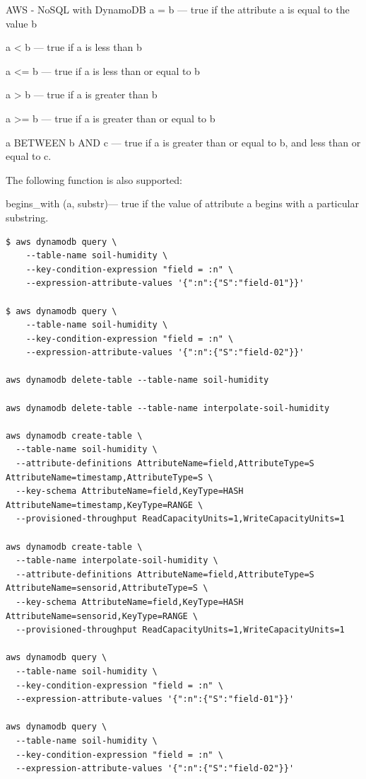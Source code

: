 \begin{frame}{AWS - NoSQL with DynamoDB}
    a = b — true if the attribute a is equal to the value b

    a < b — true if a is less than b

    a <= b — true if a is less than or equal to b

    a > b — true if a is greater than b

    a >= b — true if a is greater than or equal to b

    a BETWEEN b AND c — true if a is greater than or equal to b, and less than or equal to c.

The following function is also supported:

    begins_with (a, substr)— true if the value of attribute a begins with a particular substring.



\begin{lstlisting}
$ aws dynamodb query \
    --table-name soil-humidity \
    --key-condition-expression "field = :n" \
    --expression-attribute-values '{":n":{"S":"field-01"}}'

$ aws dynamodb query \
    --table-name soil-humidity \
    --key-condition-expression "field = :n" \
    --expression-attribute-values '{":n":{"S":"field-02"}}'
    
aws dynamodb delete-table --table-name soil-humidity

aws dynamodb delete-table --table-name interpolate-soil-humidity

aws dynamodb create-table \
  --table-name soil-humidity \
  --attribute-definitions AttributeName=field,AttributeType=S AttributeName=timestamp,AttributeType=S \
  --key-schema AttributeName=field,KeyType=HASH AttributeName=timestamp,KeyType=RANGE \
  --provisioned-throughput ReadCapacityUnits=1,WriteCapacityUnits=1

aws dynamodb create-table \
  --table-name interpolate-soil-humidity \
  --attribute-definitions AttributeName=field,AttributeType=S AttributeName=sensorid,AttributeType=S \
  --key-schema AttributeName=field,KeyType=HASH AttributeName=sensorid,KeyType=RANGE \
  --provisioned-throughput ReadCapacityUnits=1,WriteCapacityUnits=1

aws dynamodb query \
  --table-name soil-humidity \
  --key-condition-expression "field = :n" \
  --expression-attribute-values '{":n":{"S":"field-01"}}'

aws dynamodb query \
  --table-name soil-humidity \
  --key-condition-expression "field = :n" \
  --expression-attribute-values '{":n":{"S":"field-02"}}'


\end{lstlisting}
\end{frame}
